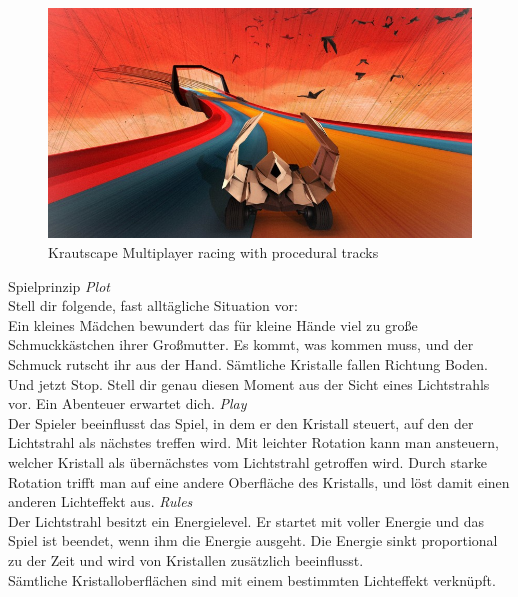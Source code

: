 {
	\begin{figure}
		\centering
		\includegraphics[width=\textwidth, height=0.7\textheight, keepaspectratio]{images/krautscape_ks1}
		\caption{Krautscape \linebreak Multiplayer racing with procedural tracks}
	\end{figure}
}

\slideonetoonetoone
{Spielprinzip}
{
	\emph{Plot}\\
	Stell dir folgende, fast alltägliche Situation vor:\\
	Ein kleines Mädchen bewundert das für kleine Hände viel zu große Schmuckkästchen ihrer Großmutter. Es kommt, was kommen muss, und der Schmuck rutscht ihr aus der Hand. Sämtliche Kristalle fallen Richtung Boden. Und jetzt Stop. Stell dir genau diesen Moment aus der Sicht eines Lichtstrahls vor. Ein Abenteuer erwartet dich.
}
{
	\emph{Play}\\
	Der Spieler beeinflusst das Spiel, in dem er den Kristall steuert, auf den der Lichtstrahl als nächstes treffen wird. Mit leichter Rotation kann man ansteuern, welcher Kristall als übernächstes vom Lichtstrahl getroffen wird. Durch starke Rotation trifft man auf eine andere Oberfläche des Kristalls, und löst damit einen anderen Lichteffekt aus.
}
{
	\emph{Rules}\\
	Der Lichtstrahl besitzt ein Energielevel. Er startet mit voller Energie und das Spiel ist beendet, wenn ihm die Energie ausgeht. Die Energie sinkt proportional zu der Zeit und wird von Kristallen zusätzlich beeinflusst.\\
	Sämtliche Kristalloberflächen sind mit einem bestimmten Lichteffekt verknüpft.
}


